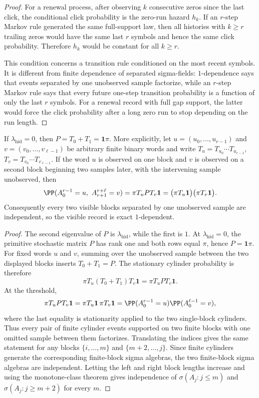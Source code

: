 \begin{proof}
For a renewal process, after observing \(k\) consecutive zeros since the last
click, the conditional click probability is the zero-run hazard \(h_k\).
If an \(r\)-step Markov rule generated the same full-support law, then all
histories with \(k\ge r\) trailing zeros would have the same last \(r\) symbols
and hence the same click probability.  Therefore \(h_k\) would be constant for
all \(k\ge r\).

This condition concerns a transition rule conditioned on the most recent
symbols.  It is different from finite dependence of separated sigma-fields:
\(1\)-dependence says that events separated by one unobserved sample
factorize, while an \(r\)-step Markov rule says that every future one-step
transition probability is a function of only the last \(r\) symbols.  For a
renewal record with full gap support, the latter would force the click
probability after a long zero run to stop depending on the run length.
\end{proof}

\begin{lemma}\label{lem:kernel-factorization-main}
If \(\lambda_{\mathrm{hid}}=0\), then \(P=T_0+T_1=\mathbf1\pi\).  More
explicitly, let \(u=(u_0,\ldots,u_{r-1})\) and
\(v=(v_0,\ldots,v_{\ell-1})\) be arbitrary finite binary words and write
\(T_u=T_{u_0}\cdots T_{u_{r-1}}\), \(T_v=T_{v_0}\cdots T_{v_{\ell-1}}\).
If the word \(u\) is observed on one block and \(v\) is observed on a second
block beginning two samples later, with the intervening sample unobserved,
then
\[
\PP(A_0^{r-1}=u,\ A_{r+1}^{r+\ell}=v)
=\pi T_u P T_v\mathbf1
=\bigl(\pi T_u\mathbf1\bigr)\bigl(\pi T_v\mathbf1\bigr).
\]
Consequently every two visible blocks separated by one unobserved sample are
independent, so the visible record is exact \(1\)-dependent.
\end{lemma}

\begin{proof}
The second eigenvalue of \(P\) is \(\lambda_{\mathrm{hid}}\), while the first is
\(1\).  At \(\lambda_{\mathrm{hid}}=0\), the primitive stochastic matrix
\(P\) has rank one and both rows equal \(\pi\), hence \(P=\mathbf1\pi\).
For fixed words \(u\) and \(v\), summing over the unobserved sample between
the two displayed blocks inserts \(T_0+T_1=P\).  The stationary cylinder
probability is therefore
\[
\pi T_u(T_0+T_1)T_v\mathbf1=\pi T_uPT_v\mathbf1.
\]
At the threshold,
\[
\pi T_uPT_v\mathbf1
=\pi T_u\mathbf1\,\pi T_v\mathbf1
=\PP(A_0^{r-1}=u)\PP(A_0^{\ell-1}=v),
\]
where the last equality is stationarity applied to the two single-block
cylinders.  Thus every pair of finite cylinder events supported on two
finite blocks with one omitted sample between them factorizes.  Translating
the indices gives the same statement for any blocks
\(\{i,\ldots,m\}\) and \(\{m+2,\ldots,j\}\).  Since finite cylinders generate
the corresponding finite-block sigma algebras, the two finite-block sigma
algebras are independent.  Letting the left and right block lengths increase
and using the monotone-class theorem gives independence of
\(\sigma(A_j:j\le m)\) and \(\sigma(A_j:j\ge m+2)\) for every \(m\).
\end{proof}

